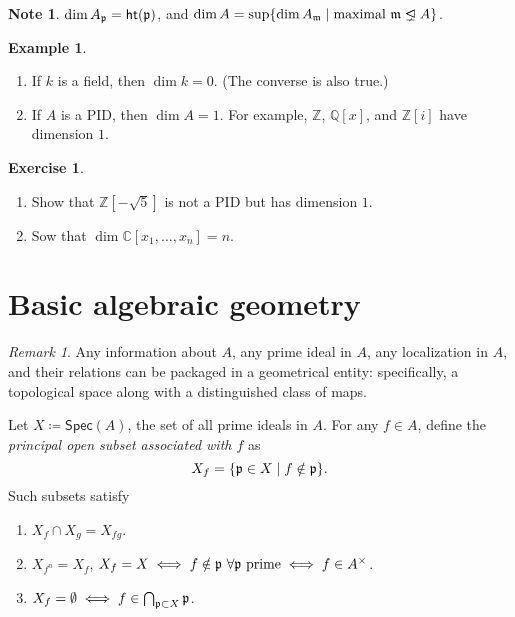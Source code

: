 \documentclass[10pt,letterpaper,cm]{nupset}
\theoremstyle{definition}
\newtheorem{exmp}[definition]{Example}
\newtheorem{note}[definition]{Note}
\theoremstyle{theorem}
\newtheorem{exercise}[definition]{Exercise}
\theoremstyle{remark}
\newtheorem{remark}[definition]{Remark}
\newcommand{\C}{\mathbb C}
\newcommand{\Q}{\mathbb Q}
\newcommand{\Z}{\mathbb Z}
\newcommand{\1}{\mathbf{1}}
\newcommand{\p}{\frak{p}}
\newcommand{\0}{\vec 0}
\newcommand{\properideal}{%
  \mathrel{\ooalign{$\lneq$\cr\raise.22ex\hbox{$\lhd$}\cr}}}
\begin{document}
\begin{note}
$\dim{A_{\p}} = \mathsf{ht}(\p)$, and $\dim{A} = \sup \{ \dim{A_{\frak{m}}} \mid \text{maximal } \frak{m} \properideal A \}$.
\end{note}

\begin{exmp} $ $
\begin{enumerate}
\item If $k$ is a field, then $\dim{k} =0$. (The converse is also true.)
\item If $A$ is a PID, then $\dim{A} =1$. For example, $\Z$, $\Q[x]$, and $\Z[i]$ have dimension $1$.
\end{enumerate}
\end{exmp}

\begin{exercise} $ $
\begin{enumerate}
\item Show that $\Z[-\sqrt{5}]$ is not a PID but has dimension $1$. 
\item Sow that $\dim{\C[x_1, \ldots, x_n]} =n$. 
\end{enumerate}
\end{exercise}

\section{Basic algebraic geometry}

\begin{remark}
Any information about $A$, any prime ideal in $A$, any localization in $A$, and their relations can be packaged in a geometrical entity: specifically, a topological space along with a distinguished class of maps. 

\medskip

 Let $X\coloneqq  \mathsf{Spec}(A)$, the set of all prime ideals in $A$.  For any $f\in A$, define the \textit{principal open subset associated with $f$} as $$X_f = \{ \p \in X \mid f\notin \p\}.$$  Such subsets satisfy 
\begin{enumerate}[label=(\alph*)]
\item $X_f \cap X_g = X_{fg}$.
\item $X_{f^n} = X_f$, $X_f = X \iff f\notin \p \ \forall \p \text{ prime} \iff f\in A^{\times}$.
\item $X_f = \emptyset \iff f \in \bigcap_{\p \subset X} \p$.
\end{enumerate}
\end{remark}
\end{document}
